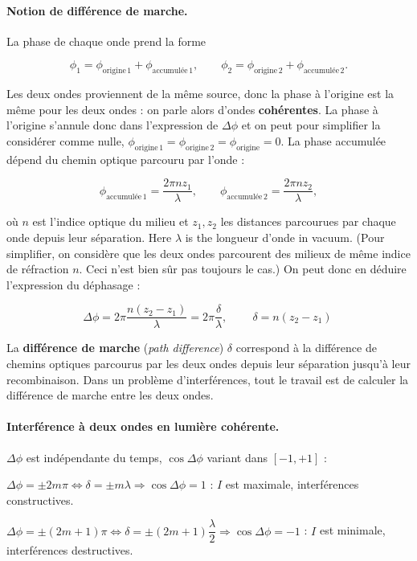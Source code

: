 \paragraph{Notion de différence de marche.} La phase de chaque onde prend la
forme

\[ \phi_1 = \phi_{\text{origine}\,1} + \phi_{\text{accumulée}\,1}, \qquad
   \phi_2 = \phi_{\text{origine}\,2} + \phi_{\text{accumulée}\,2}. \]

Les deux ondes proviennent de la même source, donc la phase à l'origine est la
même pour les deux ondes : on parle alors d'ondes \textbf{cohérentes}. La phase à
l'origine s'annule donc dans l'expression de $\Delta\phi$ et on peut pour
simplifier la considérer comme nulle,
$\phi_{\text{origine}\,1} = \phi_{\text{origine}\,2} = \phi_{\text{origine}} = 0$.
La phase accumulée dépend du chemin optique parcouru par l'onde :

\[ \phi_{\text{accumulée}\,1} = \frac{2\pi n z_1}{\lambda}, \qquad
   \phi_{\text{accumulée}\,2} = \frac{2\pi n z_2}{\lambda}, \]

où $n$ est l'indice optique du milieu et $z_1, z_2$ les distances parcourues par
chaque onde depuis leur séparation. Here $\lambda$ is the longueur d'onde in
vacuum. (Pour simplifier, on considère que les deux ondes parcourent des milieux
de même indice de réfraction $n$. Ceci n'est bien sûr pas toujours le cas.) On
peut donc en déduire l'expression du déphasage :

\[ \Delta\phi = 2\pi\frac{n(z_2 - z_1)}{\lambda} = 2\pi\frac{\delta}{\lambda},
   \qquad \boxed{\ \delta = n(z_2 - z_1)\ } \]

\begin{definition}
  La \textbf{différence de marche} (\textit{path difference}) $\delta$
  correspond à la différence de chemins optiques parcourus par les deux ondes
  depuis leur séparation jusqu'à leur recombinaison. Dans un problème
  d'interférences, tout le travail est de calculer la différence de marche entre
  les deux ondes.
\end{definition}

\paragraph{Interférence à deux ondes en lumière cohérente.} $\Delta\phi$ est
indépendante du temps, $\cos\Delta\phi$ variant dans $[-1,+1]$ :

\begin{subpart}
  \item $\Delta\phi = \pm 2m\pi \Leftrightarrow \delta = \pm m\lambda
    \Rightarrow \cos\Delta\phi = 1$ : $I$ est maximale, interférences
    constructives.
  \item $\Delta\phi = \pm(2m+1)\pi \Leftrightarrow
    \delta = \pm(2m+1)\dfrac{\lambda}{2} \Rightarrow \cos\Delta\phi = -1$ :
    $I$ est minimale, interférences destructives.
\end{subpart}


